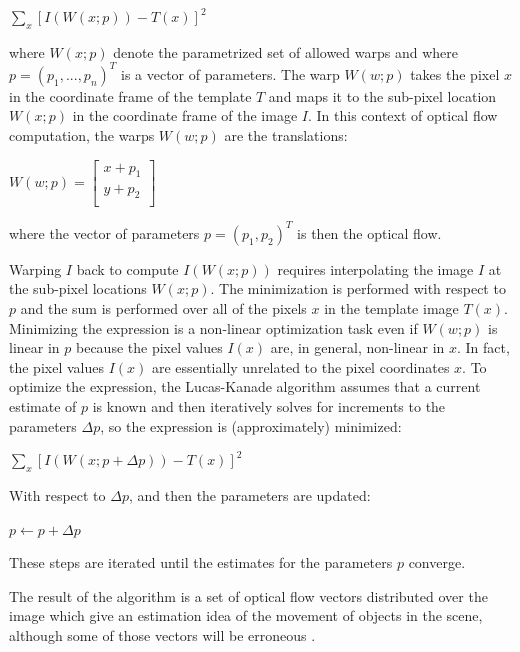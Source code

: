 \documentclass[msc, a4paper, classic, en]{ufbathesis}
\begin{document}
\begin{center}
  $\sum_{x}{[I(W(x;p))-T(x)]^2}$
\end{center}

where $W(x;p)$ denote the parametrized set of allowed warps and where $p = (p_1,...,p_n)^T$ is a vector of parameters. The warp $W(w;p)$ takes the pixel $x$ in the coordinate frame of the template $T$ and maps it to the sub-pixel location $W(x;p)$ in the coordinate frame of the image $I$. In this context of optical flow computation, the warps $W(w;p)$ are the translations:

\begin{center}
$W(w;p) = \begin{bmatrix}
          x + p_1 \\
          y + p_2 \\
          \end{bmatrix}$
\end{center}

where the vector of parameters $p = (p_1, p_2)^T$ is then the optical flow.

Warping $I$ back to compute $I(W(x;p))$ requires interpolating the image $I$ at the sub-pixel locations $W(x;p)$. The minimization is performed with respect to $p$ and the sum is performed over all of the pixels $x$ in the template image $T(x)$. Minimizing the expression is a non-linear optimization task even if $W(w;p)$ is linear in $p$ because the pixel values $I(x)$ are, in general, non-linear in $x$. In fact, the pixel values $I(x)$ are essentially unrelated to the pixel coordinates $x$. To optimize the expression, the Lucas-Kanade algorithm assumes that a current estimate of $p$ is known and then iteratively solves for increments to the parameters $\Delta{p}$, so the expression is (approximately) minimized:

\begin{center}
  $\sum_{x}{[I(W(x;p + \Delta{p}))-T(x)]^2}$
\end{center}

With respect to $\Delta{p}$, and then the parameters are updated:

\begin{center}
  $p \gets p + \Delta{p}$
\end{center}

These steps are iterated until the estimates for the parameters $p$ converge.

The result of the algorithm is a set of optical flow vectors distributed over the image which give an estimation idea of the movement of objects in the scene, although some of those vectors will be erroneous \cite{raul}.
\end{document}
